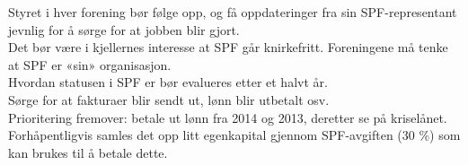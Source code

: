 \documentclass{article}[12pt]
\begin{document}
\noindent Styret i hver forening bør følge opp, og få oppdateringer fra
sin SPF-representant jevnlig for å sørge for at jobben blir gjort.\\

\noindent Det bør være i kjellernes interesse at SPF går knirkefritt.
Foreningene må tenke at SPF er «sin» organisasjon.\\

\noindent Hvordan statusen i SPF er bør evalueres etter et halvt år.\\

\noindent Sørge for at fakturaer blir sendt ut, lønn blir utbetalt osv.\\

\noindent Prioritering fremover: betale ut lønn fra 2014 og 2013, deretter
se på kriselånet. Forhåpentligvis samles det opp litt egenkapital
gjennom SPF-avgiften (30 \%) som kan brukes til å betale dette.
\end{document}
